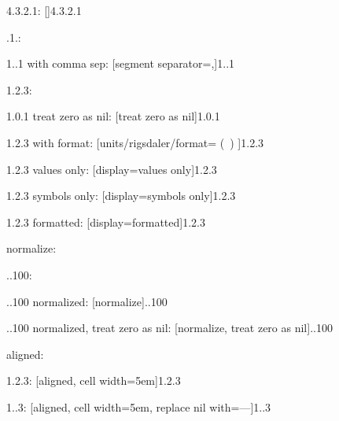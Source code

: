 \documentclass{article}
\begin{document}
4.3.2.1: \hfill {}[]{4.3.2.1}

.1.: \hfill {}

1..1 with comma sep: \hfill {}[segment separator={,}]{1..1}

1.2.3: \hfill {}

1.0.1 treat zero as nil: \hfill {}[treat zero as nil]{1.0.1}

1.2.3 with format: \hfill {}[units/rigsdaler/format={ (\SYMBOL\ \VALUE) }]{1.2.3}

1.2.3 values only: \hfill {}[display=values only]{1.2.3}

1.2.3 symbols only: \hfill {}[display=symbols only]{1.2.3}

1.2.3 formatted: \hfill {}[display=formatted]{1.2.3}

normalize:

..100: \hfill {}

..100 normalized: \hfill {}[normalize]{..100}

..100 normalized, treat zero as nil: \hfill {}[normalize, treat zero as nil]{..100}

aligned:

1.2.3: \hfill {}[aligned, cell width=5em]{1.2.3}

1..3: \hfill {}[aligned, cell width=5em, replace nil with={---}]{1..3}
\end{document}
